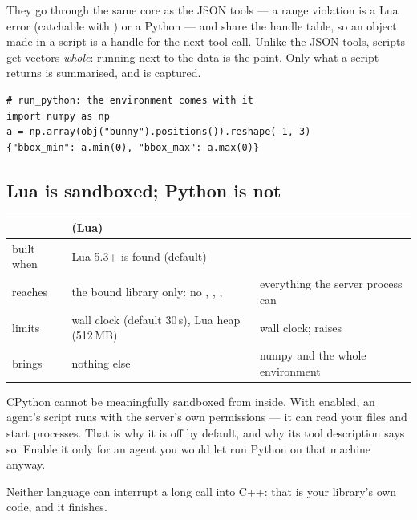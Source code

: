 They go through the same core as the JSON tools --- a range violation is a Lua
error (catchable with ) or a Python  --- and
share the handle table, so an object made in a script is a handle for the next
tool call. Unlike the JSON tools, scripts get vectors \emph{whole}: running next
to the data is the point. Only what a script returns is summarised, and
 is captured.

\begin{lstlisting}[style=py]
# run_python: the environment comes with it
import numpy as np
a = np.array(obj("bunny").positions()).reshape(-1, 3)
{"bbox_min": a.min(0), "bbox_max": a.max(0)}
\end{lstlisting}

\subsection*{Lua is sandboxed; Python is not}

\begin{center}
\small
\begin{tabular}{@{}L{3.0cm}L{5.0cm}L{5.2cm}@{}}
\toprule
 &  (Lua) &  \\
\midrule
built when & Lua 5.3+ is found (default) &  \\
reaches & the bound library only: no , , ,
   & everything the server process can \\
limits & wall clock (default 30\,s), Lua heap (512\,MB) & wall clock; raises
   \\
brings & nothing else & numpy and the whole environment \\
\bottomrule
\end{tabular}
\end{center}

\begin{warn}
CPython cannot be meaningfully sandboxed from inside. With 
enabled, an agent's script runs with the server's own permissions --- it can
read your files and start processes. That is why it is off by default, and why
its tool description says so. Enable it only for an agent you would let run
Python on that machine anyway.
\end{warn}

Neither language can interrupt a long call into C++: that is your library's
own code, and it finishes.

